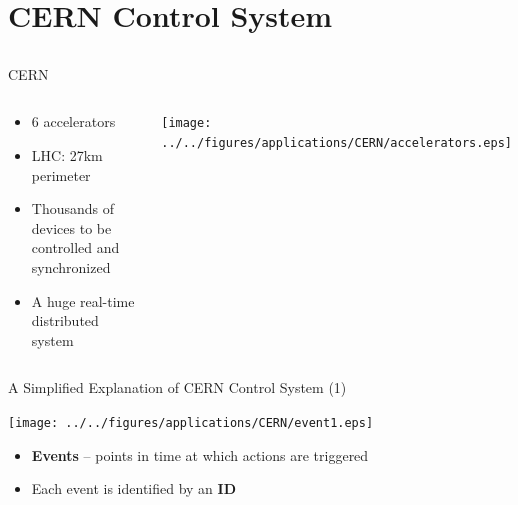 \documentclass[compress,red]{beamer}
\begin{document}
\section{CERN Control System}
\subsection{}
\begin{frame}{CERN}

\begin{columns}[c]
    \begin{center}

      \begin{itemize}
	\item 6 accelerators
	\item LHC: 27km perimeter
	\item Thousands of devices to be controlled and synchronized
	\item A huge real-time distributed system
      \end{itemize}

    \end{center}
    \begin{center}
      \texttt{[image: ../../figures/applications/CERN/accelerators.eps]}
    \end{center}
\end{columns}

\end{frame}
\begin{frame}{A Simplified Explanation of CERN Control System (1)}

      \begin{center}
      \texttt{[image: ../../figures/applications/CERN/event1.eps]}
      \end{center}

  \begin{itemize}
    \item {\bf Events} -- points in time at which actions are triggered
    \item Each event is identified by an {\bf ID}
  \end{itemize}

\end{frame}
\end{document}
